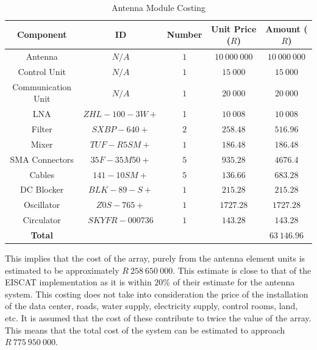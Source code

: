 \documentclass[11pt]{witseiepaper}
\begin{document}
\begin{bibunit}[witseie]
\begin{table}[htb]
    \caption{Antenna Module Costing}
    \label{tab:CostingUnit}
    \begin{center}
        \begin{tabular}{c c c c c}
            \hline 
            Component & ID & Number & Unit Price ($R$) & Amount ($R$) \\
            \hline
            Antenna & $N/A$ & $1$ & $10~000~000$ & $10~000~000$ \\
            Control Unit & $N/A$ & $1$ & $15~000$ & $15~000$ \\
            Communication Unit & $N/A$ & $1$ & $20~000$ & $20~000$ \\

            LNA & $ZHL-100-3W+$ \cite{LNA} & 1 & $10~008$ & $10~008$ \\
            Filter & $SXBP-640+$ \cite{Filter} & $2$ & $258.48$ & $516.96$ \\
            Mixer & $TUF-R5SM+$ \cite{Mixer} & $1$ & $186.48$ & $186.48$ \\
            SMA Connectors & $35F-35M50+$ \cite{SMA} & $5$ & $935.28$ & $4676.4$ \\
            Cables & $141-10SM+$ \cite{Cables} & $5$ & $136.66$ & $683.28$ \\
            DC Blocker & $BLK-89-S+$ \cite{DCBlocker} & $1$ & $215.28$ & $215.28$ \\
            Oscillator & $Z0S-765+$ \cite{Oscillator} & $1$ & $1727.28$ & $1727.28$ \\
            Circulator & $SKYFR-000736$ \cite{Circulator} & $1$ & $143.28$ & $143.28$ \\  
            \hline
            \textbf{Total} & & & & \textbf{$63~146.96$} \\ 
            \hline
        \end{tabular}
    \end{center}
\end{table}
This implies that the cost of the array, purely from the antenna element units is estimated to be approximately $R~258~650~000$. This estimate is close to that of the EISCAT implementation as it is within $20\%$ of their estimate for the antenna system.
This costing does not take into consideration the price of the installation of the data center, roads, water supply, electricity supply, control rooms, land, etc. It is assumed that the cost of these contribute to twice the value of the array.
This means that the total cost of the system can be estimated to approach $R~775~950~000$.






\end{bibunit}
\end{document}
